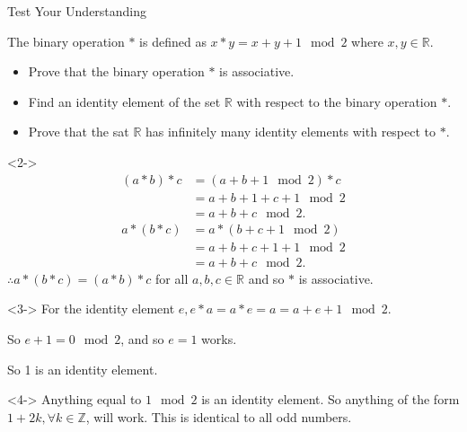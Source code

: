 \documentclass[8pt]{beamer}
\newcommand{\R}{\mathbb{R}}
\newcommand{\Z}{\mathbb{Z}}
\begin{document}
\begin{frame}[shrink]{Test Your Understanding}
	\begin{problem}
		The binary operation $*$ is defined as  $x*y=x+y+1 \mod 2$ where  $x,y\in \R$.
		\begin{itemize}
			\item Prove that the binary operation $*$ is associative.
			\item Find an identity element of the set $ \R$ with respect to the binary operation $*$.
			\item Prove that the sat $ \R$ has infinitely many identity elements with respect to $*$.

		\end{itemize}
	\end{problem}

\begin{solution}<2->
	\begin{align*}
		(a*b)*c &= (a+b+1 \mod 2) * c \\
		&= a+b+1+c+1 \mod 2 \\
		&= a + b +c \mod 2 
	.\end{align*}
	\begin{align*}
		a*(b*c) &= a*(b+c+1 \mod 2) \\
		&= a+b+c+1+1 \mod 2 \\
		&= a+b+c \mod 2 
	.\end{align*}
	$\therefore a*(b*c)=(a*b)*c$ for all  $a,b,c \in \R$ and so $*$ is associative.
\end{solution}
\begin{solution}<3->
	For the identity element $e, e*a=a*e=a=a+e+1 \mod 2$.

	So $e+1=0 \mod 2$, and so  $e=1$ works.

	So 1 is an identity element.
\end{solution}
\begin{solution}<4->
	Anything equal to $1 \mod 2$ is an identity element. So anything of the form  $1+2k, \forall k \in \Z$, will work. This is identical to all odd numbers.
\end{solution}

\end{frame}
\end{document}
